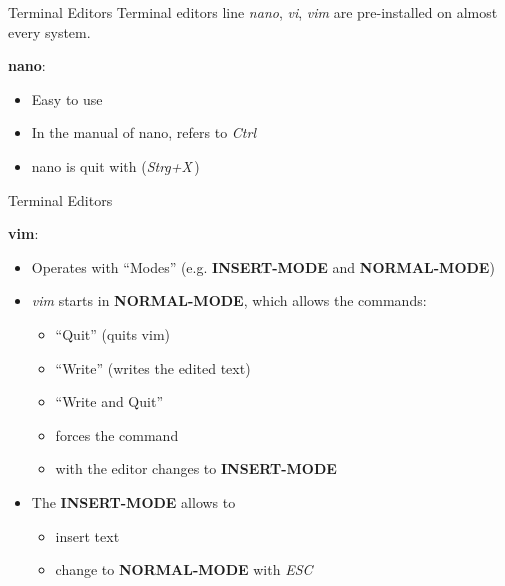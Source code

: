 \documentclass{setbeamer}
\begin{document}
\begin{frame}{Terminal Editors}
    Terminal editors line \emph{nano}, \emph{vi}, \emph{vim} are pre-installed on almost every system.

    \pause
    \vspace{0.3cm}

    \textbf{nano}:
    \begin{itemize}
        \item Easy to use
        \item In the manual of nano,  refers to \emph{Ctrl}
        \item nano is quit with  (\emph{Strg+X}\,) 
    \end{itemize}
\end{frame}

\begin{frame}{Terminal Editors}

    \textbf{vim}:
    \begin{itemize}
        \item Operates with ``Modes'' (e.g. \textbf{INSERT-MODE} and \textbf{NORMAL-MODE})
        \item \emph{vim} starts in \textbf{NORMAL-MODE}, which allows the commands:
            \begin{itemize}
                \item {}\textemdash ``Quit'' (quits vim)
                \item {}\textemdash ``Write'' (writes the edited text)
                \item {}\textemdash ``Write and Quit''
                \item {} forces the command
                \item with  the editor changes to \textbf{INSERT-MODE}
            \end{itemize}
        \item The \textbf{INSERT-MODE} allows to
            \begin{itemize}
            	\item insert text
                \item change to \textbf{NORMAL-MODE} with \emph{ESC} 
            \end{itemize}
    \end{itemize}
\end{frame}
\end{document}
